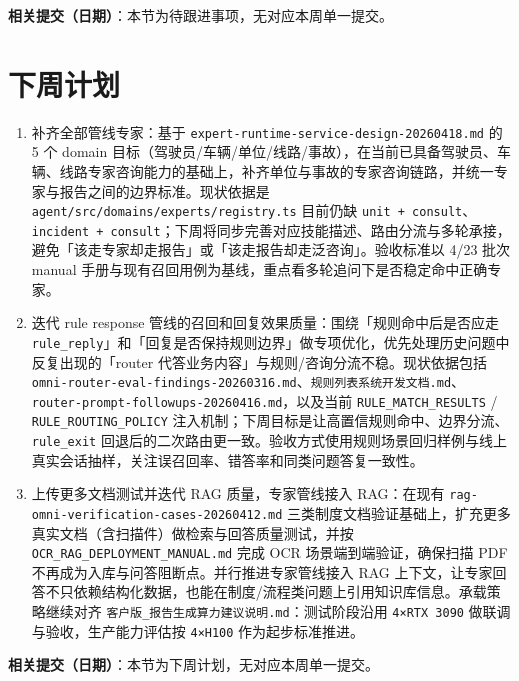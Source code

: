 \documentclass[UTF8]{ctexart}
\begin{document}
\textbf{相关提交（日期）}：本节为待跟进事项，无对应本周单一提交。

\section{下周计划}

\begin{enumerate}
\item 补齐全部管线专家：基于 \texttt{expert-runtime-service-design-20260418.md} 的 5 个 domain 目标（驾驶员/车辆/单位/线路/事故），在当前已具备驾驶员、车辆、线路专家咨询能力的基础上，补齐单位与事故的专家咨询链路，并统一专家与报告之间的边界标准。现状依据是 \texttt{agent/src/domains/experts/registry.ts} 目前仍缺 \texttt{unit + consult}、\texttt{incident + consult}；下周将同步完善对应技能描述、路由分流与多轮承接，避免「该走专家却走报告」或「该走报告却走泛咨询」。验收标准以 4/23 批次 manual 手册与现有召回用例为基线，重点看多轮追问下是否稳定命中正确专家。

\item 迭代 rule response 管线的召回和回复效果质量：围绕「规则命中后是否应走 \texttt{rule\_reply}」和「回复是否保持规则边界」做专项优化，优先处理历史问题中反复出现的「router 代答业务内容」与规则/咨询分流不稳。现状依据包括 \texttt{omni-router-eval-findings-20260316.md}、\texttt{规则列表系统开发文档.md}、\texttt{router-prompt-followups-20260416.md}，以及当前 \texttt{RULE\_MATCH\_RESULTS} / \texttt{RULE\_ROUTING\_POLICY} 注入机制；下周目标是让高置信规则命中、边界分流、\texttt{rule\_exit} 回退后的二次路由更一致。验收方式使用规则场景回归样例与线上真实会话抽样，关注误召回率、错答率和同类问题答复一致性。

\item 上传更多文档测试并迭代 RAG 质量，专家管线接入 RAG：在现有 \texttt{rag-omni-verification-cases-20260412.md} 三类制度文档验证基础上，扩充更多真实文档（含扫描件）做检索与回答质量测试，并按 \texttt{OCR\_RAG\_DEPLOYMENT\_MANUAL.md} 完成 OCR 场景端到端验证，确保扫描 PDF 不再成为入库与问答阻断点。并行推进专家管线接入 RAG 上下文，让专家回答不只依赖结构化数据，也能在制度/流程类问题上引用知识库信息。承载策略继续对齐 \texttt{客户版\_报告生成算力建议说明.md}：测试阶段沿用 \texttt{4×RTX 3090} 做联调与验收，生产能力评估按 \texttt{4×H100} 作为起步标准推进。
\end{enumerate}

\textbf{相关提交（日期）}：本节为下周计划，无对应本周单一提交。
\end{document}

